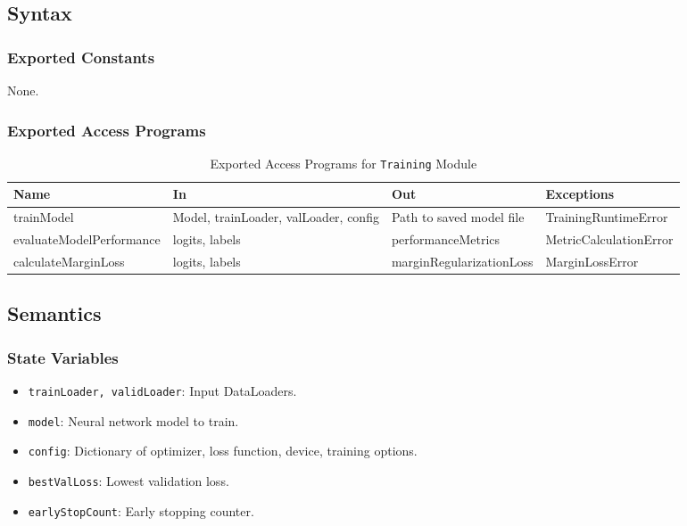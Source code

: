 \documentclass[12pt, titlepage]{article}
\begin{document}
\subsection{Syntax}
\label{sec:TrainingSyntax}

\subsubsection{Exported Constants}
None.

\subsubsection{Exported Access Programs}
\label{sec:TrainingExported}

\begin{table}[h!]
\centering
\begin{tabular}{|l|l|l|l|}
\hline
\textbf{Name}         & \textbf{In}           & \textbf{Out}             & \textbf{Exceptions} \\ \hline
trainModel            & Model, trainLoader, valLoader, config & Path to saved model file & TrainingRuntimeError \\ \hline
evaluateModelPerformance & logits, labels        & performanceMetrics       & MetricCalculationError \\ \hline
calculateMarginLoss   & logits, labels         & marginRegularizationLoss & MarginLossError \\ \hline
\end{tabular}
\caption{Exported Access Programs for \texttt{Training} Module}
\end{table}

\subsection{Semantics}
\label{sec:TrainingSemantics}

\subsubsection{State Variables}
\label{sec:TrainingStateVariables}

\begin{itemize}
    \item \texttt{trainLoader, validLoader}: Input DataLoaders.
    \item \texttt{model}: Neural network model to train.
    \item \texttt{config}: Dictionary of optimizer, loss function, device, training options.
    \item \texttt{bestValLoss}: Lowest validation loss.
    \item \texttt{earlyStopCount}: Early stopping counter.
\end{itemize}
\end{document}
